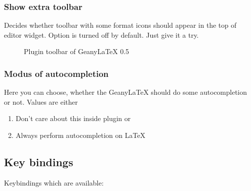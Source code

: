 \documentclass[%
paper=a4,%
fontsize=11pt,%
twoside=false,%
DIV18,
headsepline,
plainheadsepline,
footsepline,
plainfootsepline,
bibliography=totoc,%
listof=totoc,%
BCOR10mm,%
parskip=half,%
openany,%
]{scrartcl}
\begin{document}
\subsubsection{Show extra toolbar}
Decides whether toolbar with some format icons should appear in the top
of editor widget. Option is turned off by default. Just give it a try.

\begin{figure}[h!]
	\caption{Plugin toolbar of Geany\LaTeX{} 0.5}
\end{figure}

\subsubsection{Modus of autocompletion}
\label{sec:modus_of_autocompletion}
Here you can choose, whether the Geany\LaTeX{} should do some
autocompletion or not. Values are either
\begin{enumerate}
	\item Don't care about this inside plugin or
	\item Always perform autocompletion on LaTeX
\end{enumerate}


\subsection{Key bindings}
Keybindings which are available:
\end{document}
